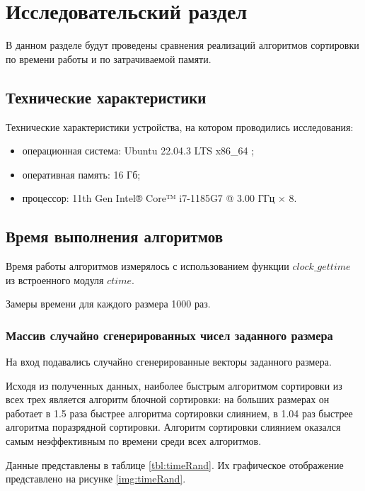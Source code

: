 \chapter{Исследовательский раздел}

В данном разделе будут проведены сравнения реализаций алгоритмов сортировки  по времени работы и по затрачиваемой памяти.

\section{Технические характеристики}

Технические характеристики устройства, на котором проводились исследования: 

\begin{itemize}[label=--]
	\item операционная система: Ubuntu 22.04.3 LTS x86\_64 \cite{os};
	\item оперативная память: 16 Гб;
	\item процессор: 11th Gen Intel® Core™ i7-1185G7 @ 3.00 ГГц × 8.
\end{itemize}

\section{Время выполнения алгоритмов}

Время работы алгоритмов измерялось с использованием функции $clock\_gettime$ из встроенного модуля $ctime$. 

Замеры времени для каждого размера 1000 раз.

\subsection{Массив случайно сгенерированных чисел заданного размера}

На вход подавались случайно сгенерированные векторы заданного размера.

Исходя из полученных данных, наиболее быстрым алгоритмом сортировки из всех трех является алгоритм блочной сортировки: на больших размерах он работает в 1.5 раза быстрее алгоритма сортировки слиянием, в 1.04 раз быстрее алгоритма поразрядной сортировки. Алгоритм сортировки слиянием оказался самым неэффективным по времени среди всех алгоритмов.

Данные представлены в таблице \ref{tbl:timeRand}. Их графическое отображение представлено на рисунке \ref{img:timeRand}.


